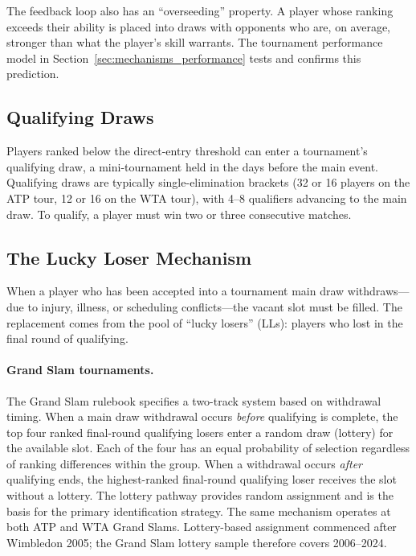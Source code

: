 The feedback loop also has an ``overseeding'' property. A player whose ranking exceeds their ability is placed into draws with opponents who are, on average, stronger than what the player's skill warrants. The tournament performance model in Section~\ref{sec:mechanisms_performance} tests and confirms this prediction.

\subsection{Qualifying Draws}

Players ranked below the direct-entry threshold can enter a tournament's qualifying draw, a mini-tournament held in the days before the main event. Qualifying draws are typically single-elimination brackets (32 or 16 players on the ATP tour, 12 or 16 on the WTA tour), with 4--8 qualifiers advancing to the main draw. To qualify, a player must win two or three consecutive matches.

\subsection{The Lucky Loser Mechanism}
\label{sec:background_ll}

When a player who has been accepted into a tournament main draw withdraws---due to injury, illness, or scheduling conflicts---the vacant slot must be filled. The replacement comes from the pool of ``lucky losers'' (LLs): players who lost in the final round of qualifying.

\paragraph{Grand Slam tournaments.} The Grand Slam rulebook specifies a two-track system based on withdrawal timing. When a main draw withdrawal occurs \textit{before} qualifying is complete, the top four ranked final-round qualifying losers enter a random draw (lottery) for the available slot. Each of the four has an equal probability of selection regardless of ranking differences within the group. When a withdrawal occurs \textit{after} qualifying ends, the highest-ranked final-round qualifying loser receives the slot without a lottery. The lottery pathway provides random assignment and is the basis for the primary identification strategy. The same mechanism operates at both ATP and WTA Grand Slams. Lottery-based assignment commenced after Wimbledon 2005; the Grand Slam lottery sample therefore covers 2006--2024.

